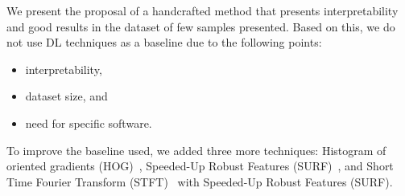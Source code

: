 \documentclass[journal,onecolumn,draftcls,11pt]{IEEEtran}
\begin{document}
We present the proposal of a handcrafted method that presents interpretability and good results in the dataset of few samples presented.
Based on this, we do not use DL techniques as a baseline due to the following points:
\begin{itemize}
    \item interpretability,
    \item dataset size, and
    \item need for specific software.
\end{itemize}

\begin{tcolorbox}[colback=white,colframe=black,title=Changes \#7]
	To improve the baseline used, we added three more techniques:
    Histogram of oriented gradients (HOG)~\cite{dalal2005histograms},
    Speeded-Up Robust Features (SURF)~\cite{bay2006surf}, and
    Short Time Fourier Transform (STFT)~\cite{portnoff1980time} with Speeded-Up Robust Features (SURF).
\end{tcolorbox}


%

\end{document}
